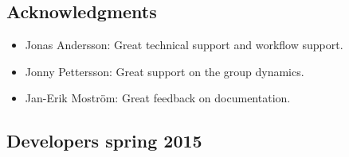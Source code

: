 \subsection*{Acknowledgments}
\begin{itemize}
	\item Jonas Andersson: Great technical support and workflow support.
	\item Jonny Pettersson: Great support on the group dynamics.
	\item Jan-Erik Moström: Great feedback on documentation.
\end{itemize}


\subsection*{Developers spring 2015}\vspace*{-10pt}
